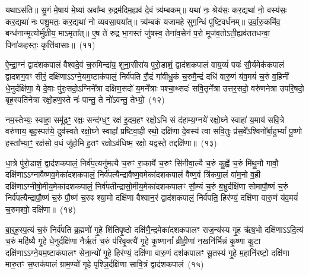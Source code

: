 यथा\-ऽस॑ति॥ सु॒गं मे॒षाय॑ मे॒ष्या॑ अवा᳚म्ब रु॒द्रम॑दिम॒ह्यव॑ दे॒वं त्र्य॑म्बकम्॥ यथा॑ नः॒ श्रेय॑सः॒ कर॒द्यथा॑ नो॒ वस्य॑सः॒ कर॒द्यथा॑ नः पशु॒मतः॒ कर॒द्यथा॑ नो व्यवसा॒यया᳚त्॥ त्र्य॑म्बकं यजामहे सुग॒न्धिं पु॑ष्टि॒वर्ध॑नम्॥ उ॒र्वा॒रु॒कमि॑व॒ बन्ध॑नान्मृ॒त्योर्मु॑क्षीय॒ मा\-ऽमृता᳚त्॥ ए॒ष ते॑ रुद्र भा॒गस्तं जु॑षस्व॒ तेना॑व॒सेन॑ प॒रो मूज॑व॒तो\-ऽती॒ह्यव॑ततधन्वा॒ पिना॑कहस्तः॒ कृत्ति॑वासाः॥~(११)

{\anuvakamend[{सुभे॑षजमिहि॒ त्रीणि॑ च}]}%

ऐ॒न्द्रा॒ग्नं द्वाद॑श\-कपालं वैश्वदे॒वं च॒रुमिन्द्रा॑य॒ शुना॒सीरा॑य पुरो॒डाशं॒ द्वाद॑श\-कपालं वाय॒व्यं॑ पयः॑ सौ॒र्यमेक॑कपालं द्वादशग॒वꣳ सीरं॒ दक्षि॑णा\-ऽ\-ऽग्ने॒यम॒ष्टा\-क॑पालं॒ निर्व॑पति रौ॒द्रं गा॑वीधु॒कं च॒रुमै॒न्द्रं दधि॑ वारु॒णं य॑व॒मयं॑ च॒रुं व॒हिनी॑ धे॒नुर्दक्षि॑णा॒ ये दे॒वाः पु॑रः॒सदो॒\-ऽग्निने᳚त्रा दक्षिण॒सदो॑ य॒मने᳚त्राः पश्चा॒थ्सदः॑ सवि॒तृने᳚त्रा उत्तर॒सदो॒ वरु॑णनेत्रा उपरि॒षदो॒ बृह॒स्पति॑नेत्रा रक्षो॒हण॒स्ते नः॑ पान्तु॒ ते नो॑\-ऽवन्तु॒ तेभ्यो॒~(१२)

नम॒स्तेभ्यः॒ स्वाहा॒ समू॑ढ॒ꣳ॒ रक्षः॒ सन्द॑ग्ध॒ꣳ॒ रक्ष॑ इ॒दम॒हꣳ रक्षो॒\-ऽभि सं द॑हाम्य॒ग्नये॑ रक्षो॒घ्ने स्वाहा॑ य॒माय॑ सवि॒त्रे वरु॑णाय॒ बृह॒स्पत॑ये॒ दुव॑स्वते रक्षो॒घ्ने स्वाहा᳚ प्रष्टिवा॒ही रथो॒ दक्षि॑णा दे॒वस्य॑ त्वा सवि॒तुः प्र॑स॒वे᳚\-ऽश्विनो᳚र्बा॒हु\-भ्यां᳚ पू॒ष्णो हस्ता᳚भ्या॒ꣳ॒ रक्ष॑सो व॒धं जु॑होमि ह॒तꣳ रक्षो\-ऽव॑धिष्म॒ रक्षो॒ यद्वस्ते॒ तद्दक्षि॑णा॥~(१३)


{\anuvakamend[{तेभ्यः॒ पञ्च॑चत्वारिꣳशच्च}]}%

धा॒त्रे पु॑रो॒डाशं॒ द्वाद॑श\-कपालं॒ निर्व॑प॒त्यनु॑मत्यै च॒रुꣳ रा॒कायै॑ च॒रुꣳ सि॑नीवा॒ल्यै च॒रुं कु॒ह्वै॑ च॒रुं मि॑थु॒नौ गावौ॒ दक्षि॑णा\-ऽ\-ऽग्नावैष्णव॒मेका॑\-दश\-कपालं॒ निर्व॑पत्यैन्द्रावैष्ण॒वमेका॑\-दश\-कपालं वैष्ण॒वं त्रि॑कपा॒लं वा॑म॒नो व॒ही दक्षि॑णा\-ऽग्नीषो॒मीय॒मेका॑\-दश\-कपालं॒ निर्व॑पतीन्द्रा\-सो॒मीय॒\-मेका॑\-दश\-कपालꣳ सौ॒म्यं च॒रुं ब॒भ्रुर्दक्षि॑णा सोमापौ॒ष्णं च॒रुं निर्व॑पत्यैन्द्रापौ॒ष्णं च॒रुं पौ॒ष्णं च॒रुꣴ श्या॒मो दक्षि॑णा वैश्वान॒रं द्वाद॑श\-कपालं॒ निर्व॑पति॒ हिर॑ण्यं॒ दक्षि॑णा वारु॒णं य॑व॒मयं॑ च॒रुमश्वो॒ दक्षि॑णा॥~(१४)

{\anuvakamend[{निर॒ष्टौ च}]}%

बा॒र्॒\mbox{}ह॒स्प॒त्यं च॒रुं निर्व॑पति ब्र॒ह्मणो॑ गृ॒हे शि॑तिपृ॒ष्ठो दक्षि॑णै॒न्द्रमेका॑\-दश\-कपालꣳ राज॒न्य॑स्य गृ॒ह ऋ॑ष॒भो दक्षि॑णा\-ऽ\-ऽदि॒त्यं च॒रुं महि॑ष्यै गृ॒हे धे॒नुर्दक्षि॑णा नैर्\mbox{}ऋ॒तं च॒रुं प॑रिवृ॒क्त्यै॑ गृ॒हे कृ॒ष्णानां᳚ व्रीही॒णां न॒खनि॑र्भिन्नं कृ॒ष्णा कू॒टा दक्षि॑णा\-ऽ\-ऽग्ने॒यम॒ष्टाक॑पालꣳ सेना॒न्यो॑ गृ॒हे हिर॑ण्यं॒ दक्षि॑णा वारु॒णं दश॑\-कपालꣳ सू॒तस्य॑ गृ॒हे म॒हानि॑रष्टो॒ दक्षि॑णा मारु॒तꣳ स॒प्तक॑पालं ग्राम॒ण्यो॑ गृ॒हे पृश्ञि॒र्दक्षि॑णा सावि॒त्रं द्वाद॑श\-कपालं~(१५)

